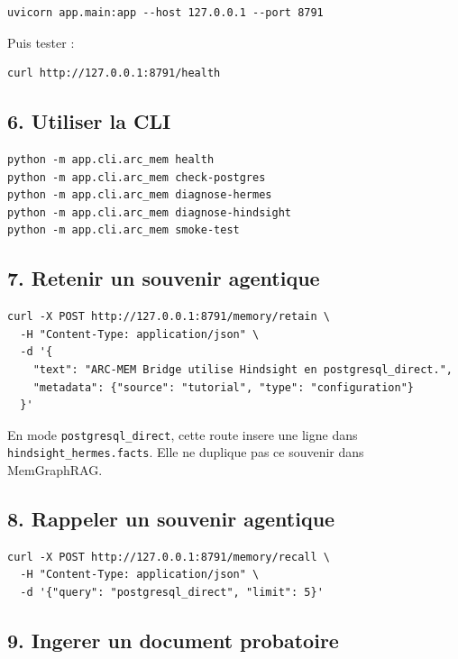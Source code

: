 \documentclass[11pt,a4paper]{article}
\begin{document}
\begin{lstlisting}
uvicorn app.main:app --host 127.0.0.1 --port 8791
\end{lstlisting}

Puis tester :

\begin{lstlisting}
curl http://127.0.0.1:8791/health
\end{lstlisting}

\subsection{6. Utiliser la CLI}

\begin{lstlisting}
python -m app.cli.arc_mem health
python -m app.cli.arc_mem check-postgres
python -m app.cli.arc_mem diagnose-hermes
python -m app.cli.arc_mem diagnose-hindsight
python -m app.cli.arc_mem smoke-test
\end{lstlisting}

\subsection{7. Retenir un souvenir agentique}

\begin{lstlisting}
curl -X POST http://127.0.0.1:8791/memory/retain \
  -H "Content-Type: application/json" \
  -d '{
    "text": "ARC-MEM Bridge utilise Hindsight en postgresql_direct.",
    "metadata": {"source": "tutorial", "type": "configuration"}
  }'
\end{lstlisting}

En mode \texttt{postgresql\_direct}, cette route insere une ligne dans
\texttt{hindsight\_hermes.facts}. Elle ne duplique pas ce souvenir dans
MemGraphRAG.

\subsection{8. Rappeler un souvenir agentique}

\begin{lstlisting}
curl -X POST http://127.0.0.1:8791/memory/recall \
  -H "Content-Type: application/json" \
  -d '{"query": "postgresql_direct", "limit": 5}'
\end{lstlisting}

\subsection{9. Ingerer un document probatoire}
\end{document}
